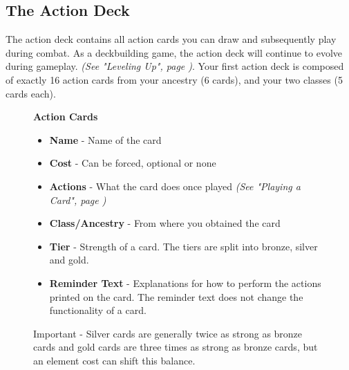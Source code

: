 \subsection{The Action Deck}
The action deck contains all action cards you can draw and subsequently play during combat. 
As a deckbuilding game, the action deck will continue to evolve during gameplay. \textit{(See "Leveling Up", page \pageref{Section_Leveling})}.
Your first action deck is composed of exactly 16 action cards from your ancestry (6 cards), and your two classes (5 cards each). 

\begin{figure}[ht]
	\begin{minipage}[t][12.1cm][t]{0.5\textwidth}
		\begin{minipage}[t][8.4cm][t]{0.9\textwidth}
			\textbf{Action Cards}
			\begin{itemize}
				\item \textbf{Name} - Name of the card
				\item\textbf{Cost} - Can be forced, optional or none
				\item\textbf{Actions} - What the card does once played \textit{(See "Playing a Card", page \pageref{Section_PlayingACard})}
				\item\textbf{Class/Ancestry} - From where you obtained the card
				\item\textbf{Tier} - Strength of a card. The tiers are split into bronze, silver and gold. 
				\item\textbf{Reminder Text} - Explanations for how to perform the actions printed on the card. The reminder text does not change the functionality of a card.
				
			\end{itemize}
			\begin{tcolorbox}[colframe=red, colback=white]
				Important - Silver cards are generally twice as strong as bronze cards and gold cards are three times as strong as bronze cards, but an element cost can shift this balance.
			\end{tcolorbox}
			

\end{minipage}
\end{minipage}
\end{figure}
